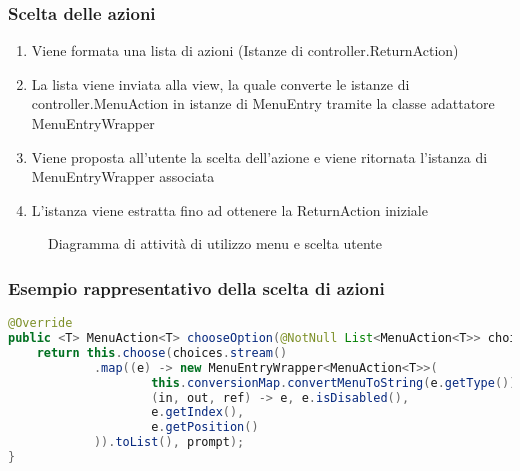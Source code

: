 \begin{frame}
    \frametitle{Scelta delle azioni}

    \begin{minipage}{.49\textwidth}
        \begin{enumerate}
            \item<1-> Viene formata una lista di azioni (Istanze di controller.ReturnAction)
            \item<2-> La lista viene inviata alla view, la quale converte le istanze di controller.MenuAction in istanze di MenuEntry tramite la classe adattatore MenuEntryWrapper
            \item<3-> Viene proposta all'utente la scelta dell'azione e viene ritornata l'istanza di MenuEntryWrapper associata
            \item <4-> L'istanza viene estratta fino ad ottenere la ReturnAction iniziale
        \end{enumerate}
    \end{minipage}
    \begin{minipage}{.49\textwidth}
        \begin{figure}
            \centering
            \caption{Diagramma di attività di utilizzo menu e scelta utente}
        \end{figure}
    \end{minipage}
    
\end{frame}

\begin{frame}[fragile]
    \frametitle{Esempio rappresentativo della scelta di azioni}
    \lstset{style=java}
    \begin{lstlisting}[language=java, caption={Snippet tratto da StreamView\#chooseOption()}]
@Override
public <T> MenuAction<T> chooseOption(@NotNull List<MenuAction<T>> choices, PromptType prompt) {
    return this.choose(choices.stream()
            .map((e) -> new MenuEntryWrapper<MenuAction<T>>(
                    this.conversionMap.convertMenuToString(e.getType()),
                    (in, out, ref) -> e, e.isDisabled(),
                    e.getIndex(),
                    e.getPosition()
            )).toList(), prompt);
}
    \end{lstlisting}
\end{frame}

